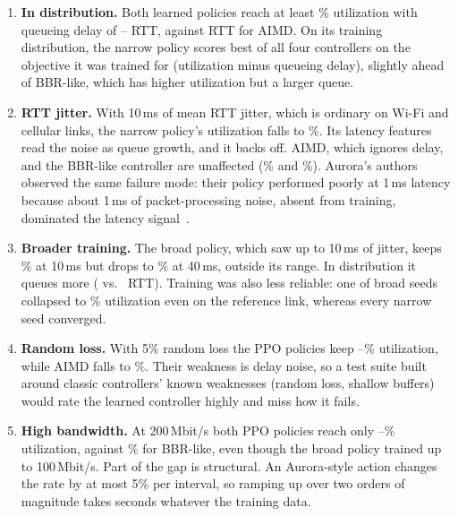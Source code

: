 \begin{enumerate}
  \item \textbf{In distribution.} Both learned policies reach at least \nCsBroadRefUtil\% utilization with queueing delay of \nCsNarrowRefQ{}--\nCsBroadRefQ{} RTT, against \nCsAimdRefQ{} RTT for AIMD. On its training distribution, the narrow policy scores best of all four controllers on the objective it was trained for (utilization minus queueing delay), slightly ahead of BBR-like, which has higher utilization but a larger queue.
  \item \textbf{RTT jitter.} With 10\,ms of mean RTT jitter, which is ordinary on Wi-Fi and cellular links, the narrow policy's utilization falls to \nCsNarrowJitterTenUtil\%. Its latency features read the noise as queue growth, and it backs off. AIMD, which ignores delay, and the BBR-like controller are unaffected (\nCsAimdJitterTenUtil\% and \nCsBbrJitterTenUtil\%). Aurora's authors observed the same failure mode: their policy performed poorly at 1\,ms latency because about 1\,ms of packet-processing noise, absent from training, dominated the latency signal~\cite{jay2019aurora}.
  \item \textbf{Broader training.} The broad policy, which saw up to 10\,ms of jitter, keeps \nCsBroadJitterTenUtil\% at 10\,ms but drops to \nCsBroadWorstUtil\% at 40\,ms, outside its range. In distribution it queues more (\nCsBroadRefQ{} vs.\ \nCsNarrowRefQ{} RTT). Training was also less reliable: one of \nCsSeeds{} broad seeds collapsed to \nCsCollapsedUtil\% utilization even on the reference link, whereas every narrow seed converged.
  \item \textbf{Random loss.} With 5\% random loss the PPO policies keep \nCsBroadLossFiveUtil--\nCsNarrowLossFiveUtil\% utilization, while AIMD falls to \nCsAimdLossFiveUtil\%. Their weakness is delay noise, so a test suite built around classic controllers' known weaknesses (random loss, shallow buffers) would rate the learned controller highly and miss how it fails.
  \item \textbf{High bandwidth.} At 200\,Mbit/s both PPO policies reach only \nCsNarrowBwTwoHundredUtil--\nCsBroadBwTwoHundredUtil\% utilization, against \nCsBbrBwTwoHundredUtil\% for BBR-like, even though the broad policy trained up to 100\,Mbit/s. Part of the gap is structural. An Aurora-style action changes the rate by at most 5\% per interval, so ramping up over two orders of magnitude takes seconds whatever the training data.
\end{enumerate}


